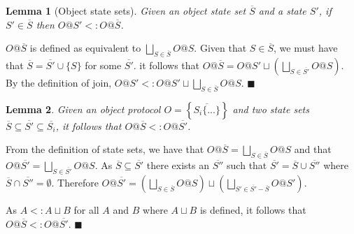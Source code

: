\documentclass{article}
\newtheorem{lem}{Lemma}
\newcommand{\qed}{$\blacksquare$}
\newenvironment{proof}{\vspace{1ex}\noindent{\bf Proof}\hspace{0.5em}}
  {\hfill\qed\vspace{1ex}}
\begin{document}
\begin{lem}[Object state sets]
Given an object state set $\overline{S}$ and a state $S'$, if
$S' \in \overline{S}$ then $O@S' <: O@\overline{S}$.
\end{lem}
\begin{proof}
$O@\overline{S}$ is defined as equivalent to
$\bigsqcup_{S \in \overline{S}}{O@S}$. Given that $S \in \overline{S}$,
we must have that $\overline{S} = \overline{S'} \cup \{ S \}$ for
some $\overline{S'}$.
it follows that $O@\overline{S} = O@S' \sqcup \left( 
\bigsqcup_{S \in \overline{S'}}{O@S} \right)$.
By the definition of join, 
$O@S' <: O@S' \sqcup \bigsqcup_{S \in \overline{S}}{O@S}$.
\end{proof}

\begin{lem}
\label{lem:ssetinc}
Given an object protocol $O = \left\{ \overline{ S_i \{ ... \} } \right\}$ and two state sets 
$\overline{S} \subseteq \overline{S'} \subseteq \overline{S_i}$, it follows
that $O@\overline{S} <: O@\overline{S'}$.
\end{lem}
\begin{proof}
From the definition of state sets, we have that 
$O@\overline{S} = \bigsqcup_{S \in \overline{S}}{O@S}$ and that
$O@\overline{S'} = \bigsqcup_{S \in \overline{S'}}{O@S}$.
As $\overline{S} \subseteq \overline{S'}$ there exists an
$\overline{S''}$ such that $\overline{S'} = \overline{S} \cup \overline{S''}$
where $\overline{S} \cap \overline{S''} = \emptyset$. Therefore
$O@\overline{S'} = \left(\bigsqcup_{S \in \overline{S}}{O@S}\right) \sqcup \left(\bigsqcup_{S' \in \overline{S'} - \overline{S}}{O@S'}\right)$.

As $A <: A \sqcup B$ for all $A$ and $B$ where $A \sqcup B$ is defined, 
it follows that $O@\overline{S} <: O@\overline{S'}$.
\end{proof}
\end{document}
